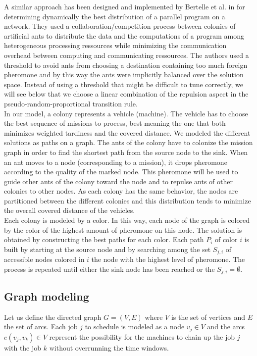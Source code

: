 \documentclass[a4paper,10pt]{article}
\begin{document}
A similar approach has been designed and implemented by Bertelle et al. in \cite{Bertelle2006,Bertelle2007} for determining dynamically the best distribution of a parallel program on a network. They used a collaboration/competition process between colonies of artificial ants to distribute the data and the computations of a program among heterogeneous processing ressources while minimizing the communication overhead between computing and communicating ressources. The authors used a threshold to avoid ants from choosing a destination containing too much foreign pheromone and by this way the ants were implicitly balanced over the solution space. Instead of using a threshold that might be difficult to tune correctly, we will see below that we choose a linear combination of the repulsion aspect in the pseudo-random-proportional transition rule.\\

In our model, a colony represents a vehicle (machine). The vehicle has to choose the best sequence of missions to process, best meaning the one that both minimizes weighted tardiness and the covered distance. We modeled the different solutions as paths on a graph. The ants of the colony have to colonize the mission graph in order to find the shortest path from the source node to the sink. When an ant moves to a node (corresponding to a mission), it drops pheromone according to the quality of the marked node. This pheromone will be used to guide other ants of the colony toward the node and to repulse ants of other colonies to other nodes. As each colony has the same behavior, the nodes are partitioned between the different colonies and this distribution tends to minimize the overall covered distance of the vehicles.\\

Each colony is modeled by a color. In this way, each node of the graph is colored by the color of the highest amount of pheromone on this node. The solution is obtained by constructing the best paths for each color. Each path $P_i$ of color $i$ is built by starting at the source node and by searching among the set $S_{j,i}$ of accessible nodes colored in $i$ the node with the highest level of pheromone. The process is repeated until either the sink node has been reached or the $S_{j,i} = \emptyset$.

\subsection{Graph modeling}
Let us define the directed graph $G = (V,E)$ where $V$ is the set of vertices and $E$ the set of arcs. Each job $j$ to schedule is modeled as a node $v_j \in V$ and the arcs $e(v_j,v_k) \in V$ represent the possibility for the machines to chain up the job $j$ with the job $k$ without overrunning the time windows.\\
\end{document}
